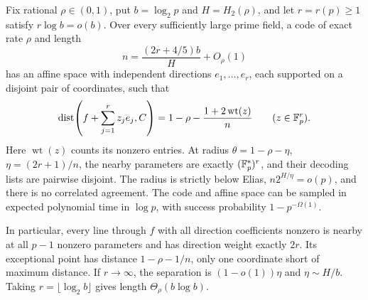 \begin{corollary}
\label{pd:full-gap}
Fix rational $\rho\in(0,1)$, put $b=\log_2p$ and $H=H_2(\rho)$,
and let $r=r(p)\ge1$ satisfy $r\log b=o(b)$. Over every sufficiently
large prime field, a code of exact rate $\rho$ and length
\[
 n=\frac{(2r+4/5)b}{H}+O_\rho(1)
\]
has an affine space with independent directions $e_1,\ldots,e_r$,
each supported on a disjoint pair of coordinates, such that
\begin{equation}\label{pd:exact-profile}
 \operatorname{dist}\!\left(f+\sum_{j=1}^r z_je_j,C\right)
 =1-\rho-\frac{1+2\operatorname{wt}(z)}n
 \qquad(z\in\mathbb F_p^r).
\end{equation}
Here $\operatorname{wt}(z)$ counts its nonzero entries. At radius
$\theta=1-\rho-\eta$, $\eta=(2r+1)/n$, the nearby parameters are
exactly $(\mathbb F_p^*)^r$, and their decoding lists are pairwise disjoint.
The radius is strictly below Elias, $n2^{H/\eta}=o(p)$, and there is
no correlated agreement. The code and affine space can be sampled in
expected polynomial time in $\log p$, with success probability
$1-p^{-\Omega(1)}$.

In particular, every line through $f$ with all direction coefficients
nonzero is nearby at all $p-1$ nonzero parameters and has direction
weight exactly $2r$. Its exceptional point has distance $1-\rho-1/n$,
only one coordinate short of maximum distance. If $r\to\infty$, the
separation is $(1-o(1))\eta$ and $\eta\sim H/b$.
Taking $r=\lfloor\log_2b\rfloor$ gives length $\Theta_\rho(b\log b)$.
\end{corollary}

